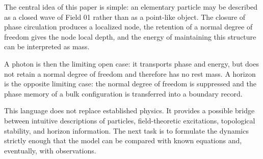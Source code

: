 \documentclass[11pt,a4paper]{article}
\begin{document}
The central idea of this paper is simple: an elementary particle may be described as a closed wave of Field 01 rather than as a point-like object. The closure of phase circulation produces a localized node, the retention of a normal degree of freedom gives the node local depth, and the energy of maintaining this structure can be interpreted as mass.

A photon is then the limiting open case: it transports phase and energy, but does not retain a normal degree of freedom and therefore has no rest mass. A horizon is the opposite limiting case: the normal degree of freedom is suppressed and the phase memory of a bulk configuration is transferred into a boundary record.

This language does not replace established physics. It provides a possible bridge between intuitive descriptions of particles, field-theoretic excitations, topological stability, and horizon information. The next task is to formulate the dynamics strictly enough that the model can be compared with known equations and, eventually, with observations.
\end{document}
